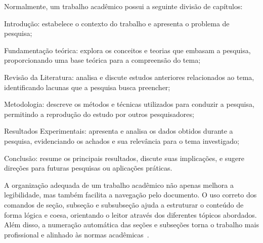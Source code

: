 \documentclass[
    12pt
    ,oneside
    ,a4paper
    ,chapter=TITLE
    ,section=TITLE
    ,sumario=abnt-6027-2012]{abntex2}
\begin{document}
Normalmente, um trabalho acadêmico possui a seguinte divisão de capítulos:

\begin{alineas}
    \item Introdução: estabelece o contexto do trabalho e apresenta o problema de pesquisa;
    \item Fundamentação teórica: explora os conceitos e teorias que embasam a pesquisa, proporcionando uma base teórica para a compreensão do tema;
    \item Revisão da Literatura: analisa e discute estudos anteriores relacionados ao tema, identificando lacunas que a pesquisa busca preencher;
    \item Metodologia: descreve os métodos e técnicas utilizados para conduzir a pesquisa, permitindo a reprodução do estudo por outros pesquisadores;
    \item Resultados Experimentais: apresenta e analisa os dados obtidos durante a pesquisa, evidenciando os achados e sua relevância para o tema investigado;
    \item Conclusão: resume os principais resultados, discute suas implicações, e sugere direções para futuras pesquisas ou aplicações práticas.
\end{alineas}

A organização adequada de um trabalho acadêmico não apenas melhora a legibilidade, mas também facilita a navegação pelo documento. O uso correto dos comandos de seção, subseção e subsubseção ajuda a estruturar o conteúdo de forma lógica e coesa, orientando o leitor através dos diferentes tópicos abordados. Além disso, a numeração automática das seções e subseções torna o trabalho mais profissional e alinhado às normas acadêmicas~\cite{gil}.





\end{document}
